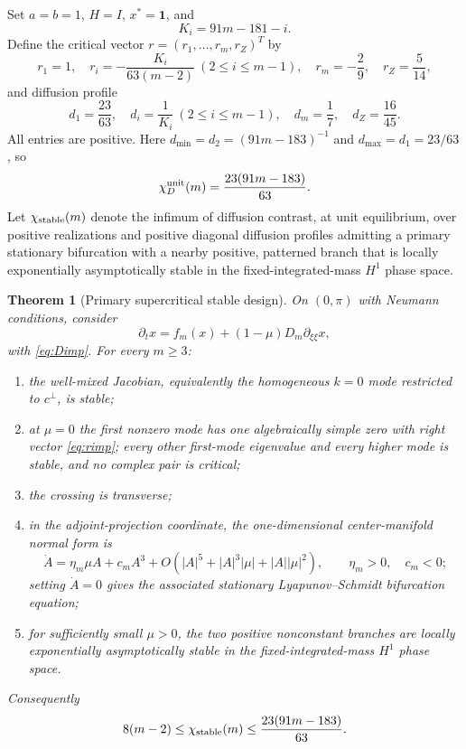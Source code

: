 \documentclass[11pt]{article}
\newtheorem{theorem}{Theorem}[section]
\theoremstyle{definition}
\newcommand{\1}{\mathbf 1}
\begin{document}
Set $a=b=1$, $H=I$, $x^*=\1$, and
\begin{equation}\label{eq:Ki}
 K_i=91m-181-i.
\end{equation}
Define the critical vector $r=(r_1,\ldots,r_m,r_Z)^T$ by
\begin{equation}\label{eq:rimp}
 r_1=1,\quad
 r_i=-\frac{K_i}{63(m-2)}\ (2\le i\le m-1),\quad
 r_m=-\frac29,\quad r_Z=\frac5{14},
\end{equation}
and diffusion profile
\begin{equation}\label{eq:Dimp}
 d_1=\frac{23}{63},\quad
 d_i=\frac1{K_i}\ (2\le i\le m-1),\quad
 d_m=\frac17,\quad d_Z=\frac{16}{45}.
\end{equation}
All entries are positive.  Here
$d_{\min}=d_2=(91m-183)^{-1}$ and $d_{\max}=d_1=23/63$, so
\begin{equation}\label{eq:improvedcontrast}
 \chi_D^{\rm unit}(m)=\frac{23(91m-183)}{63}.
\end{equation}
Let $\chi_{\rm stable}(m)$ denote the infimum of diffusion contrast, at unit
equilibrium, over positive realizations and positive diagonal diffusion
profiles admitting a primary stationary bifurcation with a nearby positive,
patterned branch that is locally exponentially asymptotically stable in the
fixed-integrated-mass $H^1$ phase space.

\begin{theorem}[Primary supercritical stable design]\label{thm:unitstable}
On $(0,\pi)$ with Neumann conditions, consider
\begin{equation}\label{eq:pdeunit}
 \partial_t x=f_m(x)+(1-\mu)D_m\partial_{\xi\xi}x,
\end{equation}
with \eqref{eq:Dimp}.  For every $m\ge3$:
\begin{enumerate}[leftmargin=2em]
\item the well-mixed Jacobian, equivalently the homogeneous $k=0$ mode
restricted to $c^\perp$, is stable;
\item at $\mu=0$ the first nonzero mode has one algebraically simple zero with
right vector \eqref{eq:rimp}; every other first-mode eigenvalue and every
higher mode is stable, and no complex pair is critical;
\item the crossing is transverse;
\item in the adjoint-projection coordinate, the one-dimensional
center-manifold normal form is
\begin{equation}\label{eq:NFunit}
 \dot A=\eta_m\mu A+c_mA^3+
 O(|A|^5+|A|^3|\mu|+|A||\mu|^2),
 \qquad \eta_m>0,\quad c_m<0;
\end{equation}
setting $\dot A=0$ gives the associated stationary Lyapunov--Schmidt
bifurcation equation;
\item for sufficiently small $\mu>0$, the two positive nonconstant branches
are locally exponentially asymptotically stable in the fixed-integrated-mass
$H^1$ phase space.
\end{enumerate}
Consequently
\begin{equation}\label{eq:stablebounds}
 8(m-2)\le\chi_{\rm stable}(m)
 \le\frac{23(91m-183)}{63}.
\end{equation}
\end{theorem}
\end{document}
